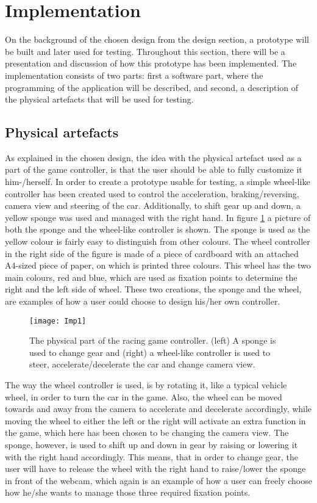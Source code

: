 \section{Implementation}
On the background of the chosen design from the design section, a prototype will be built and later used for testing.
Throughout this section, there will be a presentation and discussion of how this prototype has been implemented. 
The implementation consists of two parts: first a software part, where the programming of the application will be described, and second, a description of the physical artefacts that will be used for testing.

\subsection{Physical artefacts}
As explained in the chosen design, the idea with the physical artefact used as a part of the game controller, is that the user should be able to fully customize it him-/herself. 
In order to create a prototype usable for testing, a simple wheel-like controller has been created used to control the acceleration, braking/reversing, camera view and steering of the car. 
Additionally, to shift gear up and down, a yellow sponge was used and managed with the right hand. 
In figure \ref{fig:imp1} a picture of both the sponge and the wheel-like controller is shown. 
The sponge is used as the yellow colour is fairly easy to distinguish from other colours. 
The wheel controller in the right side of the figure is made of a piece of cardboard with an attached A4-sized piece of paper, on which is printed three colours. 
This wheel has the two main colours, red and blue, which are used as fixation points to determine the right and the left side of wheel. 
These two creations, the sponge and the wheel, are examples of how a user could choose to design his/her own controller.
\bigskip

\begin{figure}[!htbp]
\centering
\texttt{[image: Imp1]}
\caption{The physical part of the racing game controller. (left) A sponge is used to change gear and (right) a wheel-like controller is used to steer, accelerate/decelerate the car and change camera view.} 
\label{fig:imp1}
\end{figure}

The way the wheel controller is used, is by rotating it, like a typical vehicle wheel, in order to turn the car in the game. 
Also, the wheel can be moved towards and away from the camera to accelerate and decelerate accordingly, while moving the wheel to either the left or the right will activate an extra function in the game, which here has been chosen to be changing the camera view. 
The sponge, however, is used to shift up and down in gear by raising or lowering it with the right hand accordingly. 
This means, that in order to change gear, the user will have to release the wheel with the right hand to raise/lower the sponge in front of the webcam, which again is an example of how a user can freely choose how he/she wants to manage those three required fixation points.

